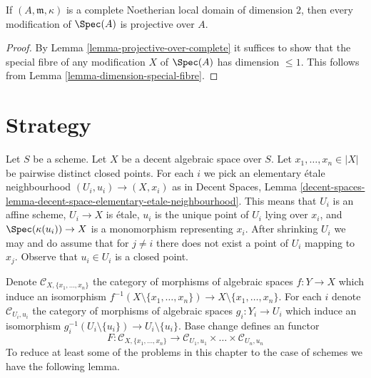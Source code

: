 \begin{lemma}
\label{lemma-modification-of-dim-2-is-projective-over-complete}
If $(A, \mathfrak m, \kappa)$ is a complete Noetherian local domain
of dimension $2$, then every modification of $\Spec(A)$ is projective over $A$.
\end{lemma}

\begin{proof}
By Lemma \ref{lemma-projective-over-complete} it suffices to show that
the special fibre of any modification $X$ of $\Spec(A)$ has dimension
$\leq 1$. This follows from Lemma \ref{lemma-dimension-special-fibre}.
\end{proof}






\section{Strategy}
\label{section-strategy}

\noindent
Let $S$ be a scheme. Let $X$ be a decent algebraic space over $S$.
Let $x_1, \ldots, x_n \in |X|$ be pairwise distinct closed points.
For each $i$ we pick an elementary \'etale neighbourhood
$(U_i, u_i) \to (X, x_i)$ as in Decent Spaces, Lemma
\ref{decent-spaces-lemma-decent-space-elementary-etale-neighbourhood}.
This means that $U_i$ is an affine scheme, $U_i \to X$ is \'etale,
$u_i$ is the unique point of $U_i$ lying over $x_i$, and
$\Spec(\kappa(u_i)) \to X$ is a monomorphism representing $x_i$.
After shrinking $U_i$ we may and do assume that for $j \not = i$
there does not exist a point of $U_i$ mapping to $x_j$.
Observe that $u_i \in U_i$ is a closed point.

\medskip\noindent
Denote $\mathcal{C}_{X, \{x_1, \ldots, x_n\}}$ the category of
morphisms of algebraic spaces $f : Y \to X$ which induce an isomorphism
$f^{-1}(X \setminus \{x_1, \ldots, x_n\}) \to X \setminus \{x_1, \ldots, x_n\}$.
For each $i$ denote $\mathcal{C}_{U_i, u_i}$ the category of
morphisms of algebraic spaces $g_i : Y_i \to U_i$ which induce an
isomorphism $g_i^{-1}(U_i \setminus \{u_i\}) \to U_i \setminus \{u_i\}$.
Base change defines an functor
\begin{equation}
\label{equation-equivalence}
F :
\mathcal{C}_{X, \{x_1, \ldots, x_n\}}
\longrightarrow
\mathcal{C}_{U_1, u_1} \times \ldots \times \mathcal{C}_{U_n, u_n}
\end{equation}
To reduce at least some of the problems in this chapter to the case
of schemes we have the following lemma.

